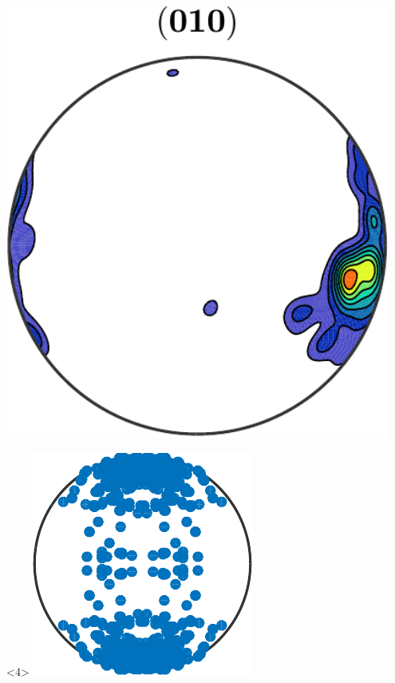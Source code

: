 \documentclass[compress]{beamer}
\begin{document}
\begin{frame}[fragile]
\begin{columns}
\begin{column}{3.5cm}
\begin{onlyenv}
        \medskip

        \includegraphics[width=0.95\textwidth]{pic/pfSimple010Smooth}
      \end{onlyenv}

      \begin{onlyenv}<4>
        \includegraphics[width=\textwidth]{pic/ipfSimple}
      \end{onlyenv}


\end{column}
\end{columns}
\end{frame}
\end{document}
